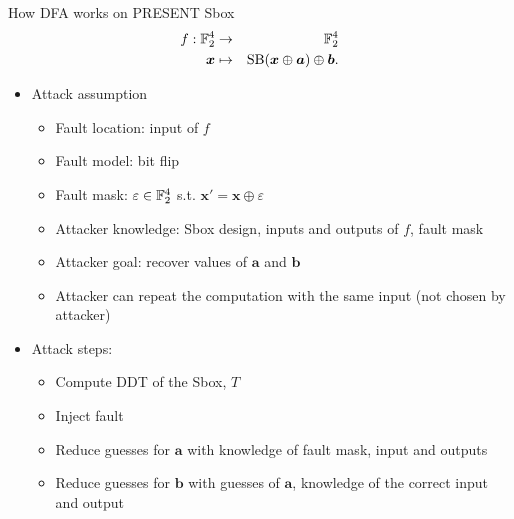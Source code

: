 \begin{frame}{How DFA works on PRESENT Sbox}
\begin{eqnarray*}
    f:{\mathbb F}_2^4&\to&{\mathbb F}_2^4\\
    \boldsymbol{x}&\mapsto& \text{SB}(\boldsymbol{x}\oplus\boldsymbol{a})\oplus\boldsymbol{b}.
\end{eqnarray*}
    \begin{itemize}
\item Attack assumption
\begin{itemize}
     \item Fault location: input of $f$
    \item Fault model: bit flip
    \item Fault mask: $\varepsilon\in{\mathbb F}_2^4$ s.t. $\boldsymbol{x}'=\boldsymbol{x}\oplus\varepsilon$
        \item Attacker knowledge: Sbox design, inputs and outputs of $f$, fault mask
        \item Attacker goal: recover values of $\boldsymbol{a}$ and $\boldsymbol{b}$
        \item Attacker can repeat the computation with the same input (not chosen by attacker)
\end{itemize}
\item Attack steps:
\begin{itemize}
    \item Compute DDT of the Sbox, $T$
    \item Inject fault
    \item Reduce guesses for $\boldsymbol{a}$ with knowledge of fault mask, input and outputs
    \item Reduce guesses for $\boldsymbol{b}$ with guesses of $\boldsymbol{a}$, knowledge of the correct input and output
\end{itemize}
    \end{itemize}
\end{frame}

